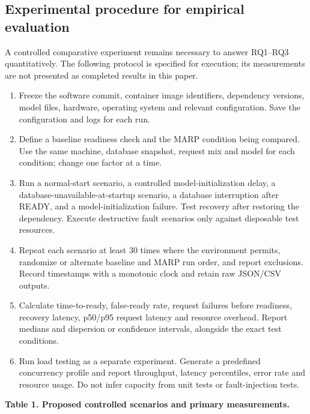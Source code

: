 \documentclass[11pt,a4paper]{article}
\begin{document}
\subsection{Experimental procedure for empirical evaluation}

A controlled comparative experiment remains necessary to answer RQ1–RQ3 quantitatively. The following protocol is specified for execution; its measurements are not presented as completed results in this paper.

\begin{enumerate}

\item Freeze the software commit, container image identifiers, dependency versions, model files, hardware, operating system and relevant configuration. Save the configuration and logs for each run.

\item Define a baseline readiness check and the MARP condition being compared. Use the same machine, database snapshot, request mix and model for each condition; change one factor at a time.

\item Run a normal-start scenario, a controlled model-initialization delay, a database-unavailable-at-startup scenario, a database interruption after READY, and a model-initialization failure. Test recovery after restoring the dependency. Execute destructive fault scenarios only against disposable test resources.

\item Repeat each scenario at least 30 times where the environment permits, randomize or alternate baseline and MARP run order, and report exclusions. Record timestamps with a monotonic clock and retain raw JSON/CSV outputs.

\item Calculate time-to-ready, false-ready rate, request failures before readiness, recovery latency, p50/p95 request latency and resource overhead. Report medians and dispersion or confidence intervals, alongside the exact test conditions.

\item Run load testing as a separate experiment. Generate a predefined concurrency profile and report throughput, latency percentiles, error rate and resource usage. Do not infer capacity from unit tests or fault-injection tests.

\end{enumerate}

\textbf{Table 1. Proposed controlled scenarios and primary measurements.}
\end{document}
